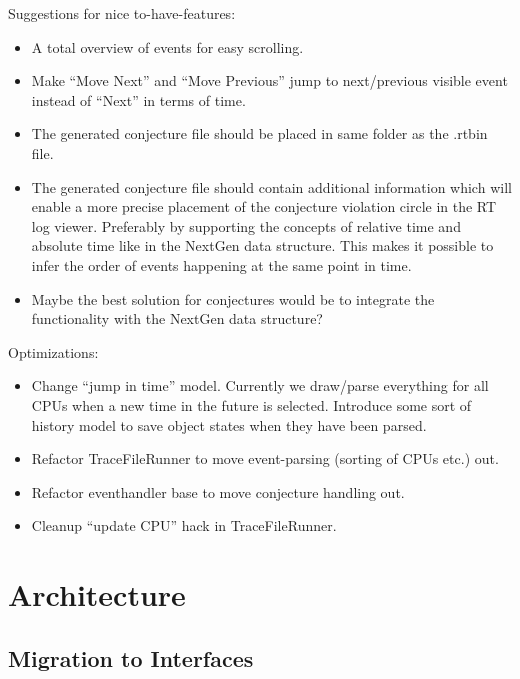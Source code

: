 \documentclass[11pt]{overturerep} \usepackage{t1enc,times,a4,t1enc}
\begin{document}
Suggestions for nice to-have-features: \begin{itemize} \item A total overview
        of events for easy scrolling.  \item Make ``Move Next'' and ``Move
            Previous'' jump to next/previous visible event instead of ``Next''
            in terms of time.
\item The generated conjecture file should be placed in same folder as the
.rtbin file.  \item The generated conjecture file should contain additional
    information which will enable a more precise placement of the conjecture
    violation circle in the RT log viewer. Preferably by supporting the
concepts of relative time and absolute time like in the NextGen data structure.
This makes it possible to infer the order of events happening at the same point
in time.  \item Maybe the best solution for conjectures would be to integrate
the functionality with the NextGen data structure?  \end{itemize}

Optimizations:

\begin{itemize} \item Change ``jump in time'' model. Currently we draw/parse
        everything for all CPUs when a new time in the future is selected.
    Introduce some sort of history model to save object states when they have
been parsed.  \item Refactor TraceFileRunner to move event-parsing (sorting of
CPUs etc.) out.  \item Refactor eventhandler base to move conjecture handling
out.  \item Cleanup ``update CPU'' hack in TraceFileRunner.  \end{itemize}






\chapter{Architecture}


\section{Migration to Interfaces} \label{sec:interfacemig}
\end{document}
